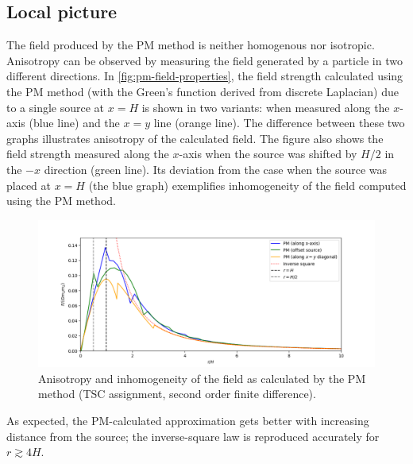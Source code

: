 \subsection{Local picture}
The field produced by the PM method is neither homogenous nor isotropic.
Anisotropy can be observed by measuring the field generated by a particle in two different directions.
In \autoref{fig:pm-field-properties}, the field strength calculated using the PM method (with the Green's function derived from discrete Laplacian) due to a single source at $x = H$ is shown in two variants: when measured along the $x$-axis (blue line) and the $x=y$ line (orange line).
The difference between these two graphs illustrates anisotropy of the calculated field.
The figure also shows the field strength measured along the $x$-axis when the source was shifted by $H/2$ in the $-x$ direction (green line).
Its deviation from the case when the source was placed at $x=H$ (the blue graph) exemplifies inhomogeneity of the field computed using the PM method.
\begin{figure}[htp]
    \centering
    \includegraphics[scale=0.55]{img/pm/pm-field-combined.png}
    \caption{Anisotropy and inhomogeneity of the field as calculated by the PM method (TSC assignment, second order finite difference).}
    \label{fig:pm-field-properties}
\end{figure}
As expected, the PM-calculated approximation gets better with increasing distance from the source;
the inverse-square law is reproduced accurately for $r \gtrsim 4H$.

